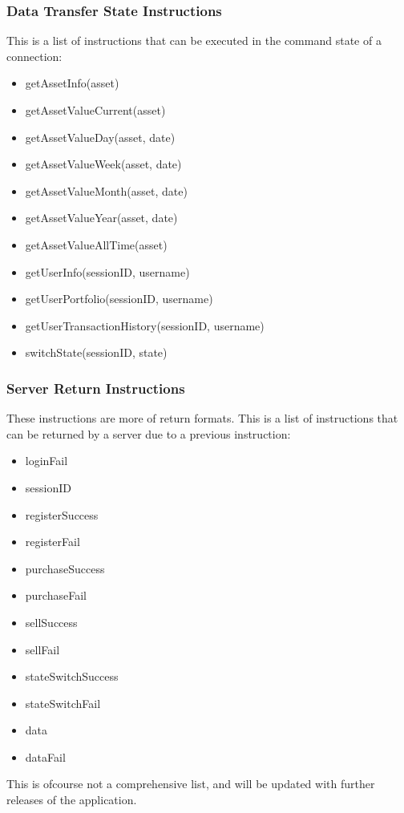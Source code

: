\documentclass[a4paper]{article}
\begin{document}
\subsubsection{Data Transfer State Instructions}
\label{protocol_datastate_inst}
This is a list of instructions that can be executed in the command state of a
connection:
\begin{itemize}
	\item getAssetInfo(asset)
	\item getAssetValueCurrent(asset)
	\item getAssetValueDay(asset, date)
	\item getAssetValueWeek(asset, date)
	\item getAssetValueMonth(asset, date)
	\item getAssetValueYear(asset, date)
	\item getAssetValueAllTime(asset)
	\item getUserInfo(sessionID, username)
	\item getUserPortfolio(sessionID, username)
	\item getUserTransactionHistory(sessionID, username)
	\item switchState(sessionID, state)
\end{itemize}

\subsubsection{Server Return Instructions}
\label{protocol_serverret_inst}
These instructions are more of return formats. This is a list of instructions 
that can be returned by a server due to a previous instruction:
\begin{itemize}
	\item loginFail
	\item sessionID
	\item registerSuccess
	\item registerFail
	\item purchaseSuccess
	\item purchaseFail
	\item sellSuccess
	\item sellFail
	\item stateSwitchSuccess
	\item stateSwitchFail
	\item data
	\item dataFail
\end{itemize}

This is ofcourse not a comprehensive list, and will be updated with further
releases of the application.
\end{document}
